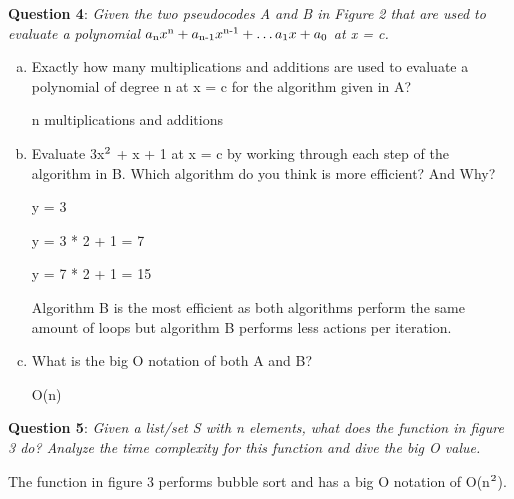 \documentclass{article} %
\newcommand{\question}[2][]{\begin{flushleft}
        \textbf{Question #1}: \textit{#2}

\end{flushleft}}
\begin{document}
    \question[4]{Given the two pseudocodes A and B in Figure 2 that are used to evaluate a polynomial $a\textsubscript{n}x\textsuperscript{n} + a\textsubscript{n-1}x\textsuperscript{n-1} + \dots a\textsubscript{1}x + a\textsubscript{0}$ at x = c.}
    \begin{enumerate}[(a)]
        \item {Exactly how many multiplications and additions are used to evaluate a polynomial of degree n at x = c for the algorithm given in A?}
        
        n multiplications and additions
        \item {Evaluate 3x$\textsuperscript{2}$ + x + 1 at x = c by working through each step of the algorithm in B. Which algorithm do you think is more efficient? And Why?}
        
        y = 3

        y = 3 * 2 + 1 = 7

        y = 7 * 2 + 1 = 15

        Algorithm B is the most efficient as both algorithms perform the same amount of loops but algorithm B performs less actions per iteration.
        \item {What is the big O notation of both A and B?}
        
        O(n)
    \end{enumerate}

    \question[5]{Given a list/set S with n elements, what does the function in figure 3 do? Analyze the time complexity for this function and dive the big O value.}

    The function in figure 3 performs bubble sort and has a big O notation of O(n$\textsuperscript{2}$).
    
\end{document}
